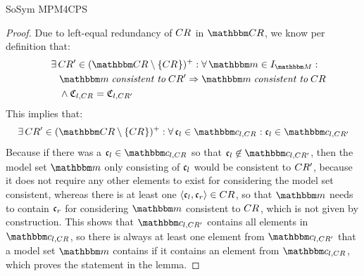 \begin{copiedFrom}{SoSym MPM4CPS}
\begin{proof}
    Due to left-equal redundancy of $CR_{}$ in $\consistencyrelationset{CR}$, we know per definition that:
    \begin{align*}
        \formulaskip &
        \exists \consistencyrelation{CR'}{} \in \transitiveclosure{(\consistencyrelationset{CR} \setminus \setted{\consistencyrelation{CR}{}})} :
        \forall \modelset{m} \in \metamodelinstances{\metamodelset{M}} : \\
        & \formulaskip
        \modelset{m} \consistenttomath \consistencyrelation{CR'}{} \Rightarrow \modelset{m} \consistenttomath \consistencyrelation{CR}{} \\
        & \formulaskip
        \land 
        \classtuple{C}{l,\consistencyrelation{CR}{}} = \classtuple{C}{l,\consistencyrelation{CR'}{}}
    \end{align*}
    This implies that:
    \begin{align*}
        \formulaskip &
        \exists \consistencyrelation{CR'}{} \in \transitiveclosure{(\consistencyrelationset{CR} \setminus \setted{\consistencyrelation{CR}{}})} :
        \forall \conditionelement{c}{l} \in \condition{c}{l,\consistencyrelation{CR}{}} :
        \conditionelement{c}{l} \in \condition{c}{l,\consistencyrelation{CR'}{}}
    \end{align*}
    Because if there was a $\conditionelement{c}{l} \in \condition{c}{l,\consistencyrelation{CR}{}}$ so that $\conditionelement{c}{l} \not\in \condition{c}{l,\consistencyrelation{CR'}{}}$, then the model set $\modelset{m}$ only consisting of $\mathfrak{c}_{l}$ would be consistent to $CR'_{}$, because it does not require any other elements to exist for considering the model set consistent, whereas there is at least one $\langle \mathfrak{c}_{l}, \mathfrak{c}_{r} \rangle \in CR_{}$, so that $\modelset{m}$ needs to contain $\mathfrak{c}_{r}$ for considering $\modelset{m}$ consistent to $CR_{}$, which is not given by construction.
    This shows that $\condition{c}{l,\consistencyrelation{CR'}{}}$ contains all elements in $\condition{c}{l,\consistencyrelation{CR}{}}$, so there is always at least one element from $\condition{c}{l,\consistencyrelation{CR'}{}}$ that a model set $\modelset{m}$ contains if it contains an element from $\condition{c}{l,\consistencyrelation{CR}{}}$, %
    which proves the statement in the lemma.
\end{proof}


\end{copiedFrom}
